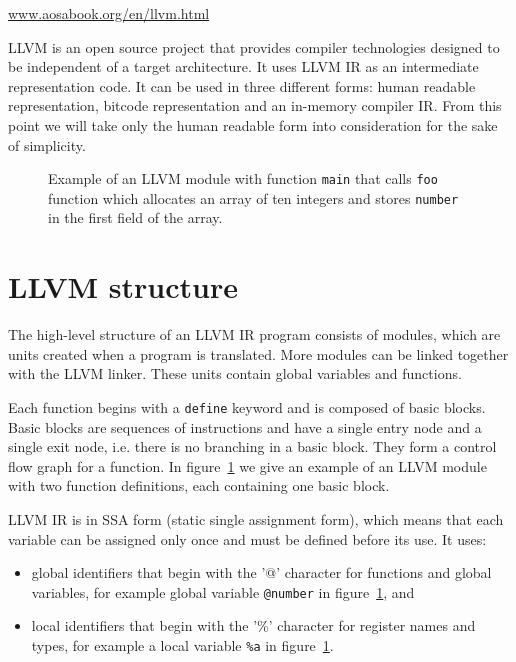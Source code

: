 \url{www.aosabook.org/en/llvm.html}
\medskip

LLVM is an open source project that provides compiler technologies designed to
be independent of a target architecture. It uses LLVM IR as an intermediate
representation code. It can be used in three different forms: human readable
representation, bitcode representation and an in-memory compiler IR. From this
point we will take only the human readable form into consideration for the sake
of simplicity.

\begin{figure}[h]
 
 \caption{Example of an LLVM module with function \texttt{main} that calls
 \texttt{foo} function which allocates an array of ten integers and stores
 \texttt{number} in the first field of the array.}
 \label{fig:llvm_example}
\end{figure}

\section{LLVM structure} %

The high-level structure of an LLVM IR program consists of modules, which are
units created when a program is translated. More modules can be linked together
with the LLVM linker. These units contain global variables and functions.

Each function begins with a \texttt{define} keyword and is composed of basic
blocks. Basic blocks are sequences of instructions and have a single entry node
and a single exit node, i.e. there is no branching in a basic block. They form
a control flow graph for a function. In figure~\ref{fig:llvm_example} we give
an example of an LLVM module with two function definitions, each containing one
basic block.

LLVM IR is in SSA form (static single assignment form), which means that each
variable can be assigned only once and must be defined before its use. It uses:

\begin{itemize}
    \item global identifiers that begin with the '@' character for functions
    and global variables, for example global variable \texttt{@number} in
    figure~\ref{fig:llvm_example}, and
    \item local identifiers that begin with the '\%' character for register
    names and types, for example a local variable \texttt{\%a} in
    figure~\ref{fig:llvm_example}.
\end{itemize}

